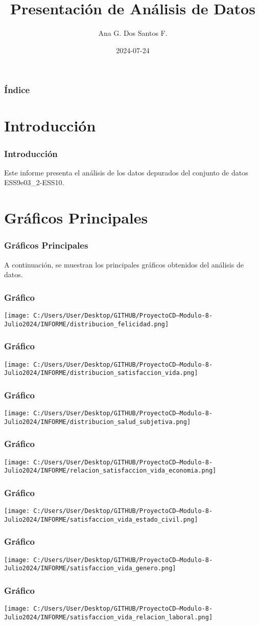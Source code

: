 \documentclass{beamer}\usepackage[]{graphicx}\usepackage[]{xcolor}
\title{Presentación de Análisis de Datos}
\author{Ana G. Dos Santos F.}
\date{2024-07-24}
\begin{document}
\begin{frame}
  \titlepage
\end{frame}

\begin{frame}
  \frametitle{Índice}
  \tableofcontents
\end{frame}

\section{Introducción}
\begin{frame}
  \frametitle{Introducción}
  Este informe presenta el análisis de los datos depurados del conjunto de datos ESS9e03\_2-ESS10.
\end{frame}

\section{Gráficos Principales}
\begin{frame}
  \frametitle{Gráficos Principales}
  A continuación, se muestran los principales gráficos obtenidos del análisis de datos.
\end{frame}



\begin{frame}
\frametitle{Gráfico}
\texttt{[image: C:/Users/User/Desktop/GITHUB/ProyectoCD---Modulo-8-Julio2024/INFORME/distribucion\_felicidad.png]}
\end{frame}
\begin{frame}
\frametitle{Gráfico}
\texttt{[image: C:/Users/User/Desktop/GITHUB/ProyectoCD---Modulo-8-Julio2024/INFORME/distribucion\_satisfaccion\_vida.png]}
\end{frame}
\begin{frame}
\frametitle{Gráfico}
\texttt{[image: C:/Users/User/Desktop/GITHUB/ProyectoCD---Modulo-8-Julio2024/INFORME/distribucion\_salud\_subjetiva.png]}
\end{frame}
\begin{frame}
\frametitle{Gráfico}
\texttt{[image: C:/Users/User/Desktop/GITHUB/ProyectoCD---Modulo-8-Julio2024/INFORME/relacion\_satisfaccion\_vida\_economia.png]}
\end{frame}
\begin{frame}
\frametitle{Gráfico}
\texttt{[image: C:/Users/User/Desktop/GITHUB/ProyectoCD---Modulo-8-Julio2024/INFORME/satisfaccion\_vida\_estado\_civil.png]}
\end{frame}
\begin{frame}
\frametitle{Gráfico}
\texttt{[image: C:/Users/User/Desktop/GITHUB/ProyectoCD---Modulo-8-Julio2024/INFORME/satisfaccion\_vida\_genero.png]}
\end{frame}
\begin{frame}
\frametitle{Gráfico}
\texttt{[image: C:/Users/User/Desktop/GITHUB/ProyectoCD---Modulo-8-Julio2024/INFORME/satisfaccion\_vida\_relacion\_laboral.png]}
\end{frame}
\end{document}
